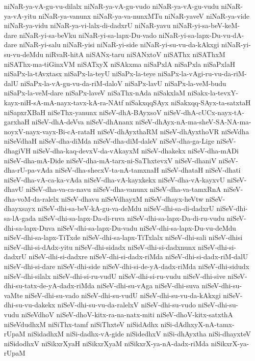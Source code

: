 {niNaR-ya-vA-gu-vu-dilalx
niNaR-ya-vA-gu-vudo
niNaR-ya-vA-gu-vudu
niNaR-ya-vA-yitu
niNaR-ya-vanunx
niNaR-ya-va-nunxMTu
niNaR-yaveV
niNaR-ya-vide
niNaR-ya-vidu
niNaR-ya-vi-lalx-di-dadxrU
niNaR-yavu
niNaR-yi-sa-beV-keM-dare
niNaR-yi-sa-beVku
niNaR-yi-sa-lapx-Du-vado
niNaR-yi-sa-lapx-Du-vu-dA-dare
niNaR-yi-salu
niNaR-yisi
niNaR-yi-side
niNaR-yi-su-vu-da-kAkxgi
niNaR-yi-su-vu-deMdu
niRvaR-hitA
niSANx-taru
niSANxtoV
niSAThx
niSAThxM
niSAThx-ma-tiGinxVM
niSATxyX
niSAkxma
niSaPxlA
niSaPxla
niSaPxlaH
niSaPx-la-tAvxtasx
niSaPx-la-teyU
niSaPx-la-teye
niSaPx-la-vAgi-ru-vu-da-riM-dalU
niSaPx-la-vA-gu-vu-da-riM-daloV
niSaPx-lavU
niSaPx-la-veM-budu
niSaPx-la-veM-dare
niSaPx-laveV
niSaThx-nAda
niSakxlaM
niSakx-la-tevxY-kayx-niH-sA-mA-nayx-tavx-kA-ra-NAtf
niSakxqqSAyx
niSakxqq-SAyx-ta-satxtaH
niSapxrXBaH
niSeThx-yanunx
niSeV-dhA-BAyxsoV
niSeV-dhA-cUCx-nayx-tA-garxhaH
niSeV-dhA-deVva
niSeV-dhAnanx
niSeV-dhAyx-nA-ma-sheV-SA-NA-ma-noyxV-nayx-vayx-Bi-cA-rataH
niSeV-dhAyxthaRM
niSeV-dhAyxthoVR
niSeVdha
niSeVdhaH
niSeV-dha-diMda
niSeV-dha-diM-daleV
niSeV-dha-ga-Lige
niSeV-dhagiVH
niSeV-dha-kaq-devxV-da-vAkayxM
niSeV-dhakekx
niSeV-dha-mADi
niSeV-dha-mA-Dide
niSeV-dha-mA-tarx-ni-SaThxtevxV
niSeV-dhaniV
niSeV-dha-rU-pa-vAda
niSeV-dha-shecxV-ta-nA-tamxnaH
niSeV-dhataH
niSeV-dhati
niSeV-dha-vA-ca-ka-vAda
niSeV-dha-vA-kayxkekx
niSeV-dha-vA-kayxvU
niSeV-dhavU
niSeV-dha-va-ca-navu
niSeV-dha-vanunx
niSeV-dha-va-tamxRnA
niSeV-dha-voM-da-ralelx
niSeV-dhavu
niSeVdhayxM
niSeV-dhayx-heVtw
niSeV-dhayxsayx
niSeV-dhi-sa-beV-kA-gu-va-deMdu
niSeV-dhi-sa-di-dadxrU
niSeV-dhi-sa-lA-gada
niSeV-dhi-sa-lapx-Da-di-ruva
niSeV-dhi-sa-lapx-Da-di-ru-vudu
niSeV-dhi-sa-lapx-Duva
niSeV-dhi-sa-lapx-Du-vadu
niSeV-dhi-sa-lapx-Du-vu-deMdu
niSeV-dhi-sa-lapx-TiTxde
niSeV-dhi-sa-lapx-TiTxlalx
niSeV-dhi-sali
niSeV-dhisi
niSeV-dhi-si-dAdx-yitu
niSeV-dhi-sidadx
niSeV-dhi-si-dadxnunx
niSeV-dhi-si-dadxrU
niSeV-dhi-si-dadxre
niSeV-dhi-si-dadx-riMda
niSeV-dhi-si-dadx-riM-dalU
niSeV-dhi-si-dare
niSeV-dhi-side
niSeV-dhi-si-de-yA-dadx-riMda
niSeV-dhi-sidudx
niSeV-dhi-silalx
niSeV-dhi-si-ru-vudU
niSeV-dhi-si-ru-vudu
niSeV-dhi-sive
niSeV-dhi-su-tatx-de-yA-dadx-riMda
niSeV-dhi-su-vAga
niSeV-dhi-suva
niSeV-dhi-su-vaMte
niSeV-dhi-su-vado
niSeV-dhi-su-vudU
niSeV-dhi-su-vu-da-kAkxgi
niSeV-dhi-su-vu-dakekx
niSeV-dhi-su-vu-da-ralelxV
niSeV-dhi-su-vudo
niSeV-dhi-su-vudu
niSeVdhoV
niSeV-dhoV-kitx-ra-na-natx-miti
niSeV-dhoV-kitx-satxthA
niSeVdudhxM
niSiThx-tamf
niSiThxteV
niSidAdhx
niSi-dAdhxyX-nA-tamx-rUpaM
niSidadhxM
niSi-dadhx-vA-gide
niSidedhxV
niSi-dhAyxtha
niSi-dhayxteV
niSidodhxV
niSikxrXyaH
niSikxrXyaM
niSikxrX-ya-nA-dadx-riMda
niSikxrX-ya-rUpaM
}
